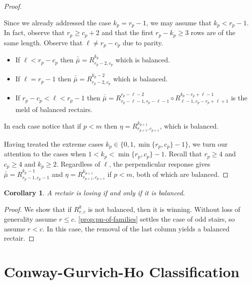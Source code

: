 \documentclass[pdflatex,sn-mathphys-num]{sn-jnl}%
\theoremstyle{thmstyleone}%
\newtheorem{cor}{Corollary}
\theoremstyle{thmstyletwo}%
\theoremstyle{thmstylethree}%
\begin{document}
\begin{proof}
\begin{description}
            Since we already addressed the case $k_p=r_p-1$, we may assume that $k_p < r_p-1$. 
            In fact, observe that $r_p\ge c_p+2$ and that the first $r_p-k_p\ge 3$ rows are of the same length. 
            Observe that $\ell \neq r_p - c_p$ due to parity. 
            \begin{itemize}
                \item If $\ell < r_p-c_p$ then $\bar{\bar \mu} = R^{k_p}_{r_p-2, c_p}$  which is balanced. 
                \item If $\ell = r_p-1$ then $\bar{\bar \mu} = R^{k_p-2}_{r_p-2, c_p}$ which is balanced. 
                \item If $r_p-c_p < \ell < r_p-1$ then 
$\bar{\bar \mu} = R^{r_p - \ell - 2}_{r_p - \ell - 1, r_p - \ell -1} \diamond R^{k_p - r_p+\ell-1}_{\ell-1, c_p-r_p+\ell + 1}  $ is the meld of balanced rectairs. 
            \end{itemize}
            In each case notice that if $p < m$ then $\eta=R^{k_{p+1}}_{r_{p+1},c_{p+1}}$, which is balanced.

\end{description}
            Having treated the extreme cases $k_p \in \{0, 1, \min\{r_p, c_p\}-1\}$, we turn our attention to the cases when $1 < k_p < \min\{r_p, c_p\}-1$. 
            Recall that $r_p \geq 4$ and $c_p \geq 4$ and $k_p \geq 2$. 
            Regardless of $\ell$, the perpendicular response gives $\bar{\bar \mu} = R^{k_p-1}_{r_p - 1, c_p - 1}$ and $\eta = R^{k_{p+1}}_{r_{p+1}, c_{p+1}}$ if $p < m$, both of which are balanced. 
\end{proof}

\begin{cor}
    A rectair is losing if and only if it is balanced. 
\end{cor}

\begin{proof}
    We show that if $R_{r,c}^k$ is not balanced, then it is winning. 
%
    Without loss of generality assume $r \le c$. 
    \cref{prop:pn-of-families} settles the case of odd stairs, so assume $r<c$.
    In this case, the removal of the last column yields a balanced rectair.
\end{proof}


\section{Conway-Gurvich-Ho Classification} \label{sec:CG}
\end{document}
